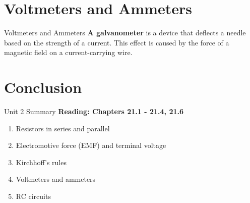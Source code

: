 \documentclass{beamer}
\begin{document}
\section{Voltmeters and Ammeters}

\begin{frame}{Voltmeters and Ammeters}
\textbf{\alert{A galvanometer}} is a device that deflects a needle based on the strength of a current.  This effect is caused by the force of a magnetic field on a current-carrying wire.
\end{frame}

\section{Conclusion}

\begin{frame}{Unit 2 Summary}
\textbf{Reading: Chapters 21.1 - 21.4, 21.6}
\begin{enumerate}
\item Resistors in series and parallel
\item Electromotive force (EMF) and terminal voltage
\item Kirchhoff's rules
\item Voltmeters and ammeters
\item RC circuits
\end{enumerate}
\end{frame}
\end{document}
